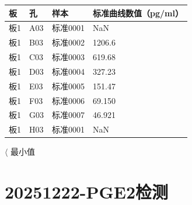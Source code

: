 \documentclass[UTF8,10pt,a4paper,fontset=fandol]{ctexart}
\newcommand{\fieldvalue}[1]{#1}
\begin{document}
\begin{tabular}{llll}
板 & 孔 & 样本 & 标准曲线数值（pg/ml）\\ \hline
板1 & A03 &
\fieldvalue{标准0001} &
\fieldvalue{NaN}\\
板1 & B03 &
\fieldvalue{标准0002} &
\fieldvalue{1206.6}\\
板1 & C03 &
\fieldvalue{标准0003} &
\fieldvalue{619.68}\\
板1 & D03 &
\fieldvalue{标准0004} &
\fieldvalue{327.23}\\
板1 & E03 &
\fieldvalue{标准0005} &
\fieldvalue{151.47}\\
板1 & F03 &
\fieldvalue{标准0006} &
\fieldvalue{69.150}\\
板1 & G03 &
\fieldvalue{标准0007} &
\fieldvalue{46.921}\\
板1 & H03 &
\fieldvalue{标准0001} &
\fieldvalue{NaN}\\
\end{tabular}

\hfill $\langle$ 最小值

\newpage

\section*{20251222-PGE2检测}
\end{document}
